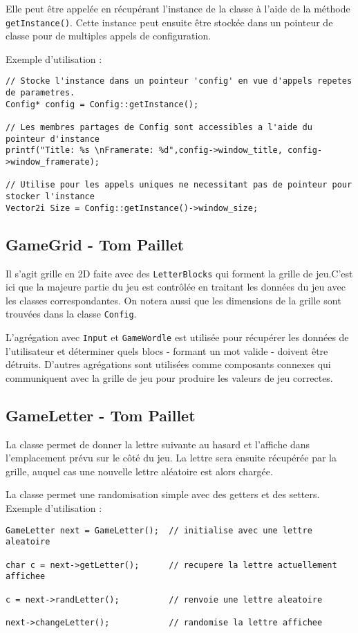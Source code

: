 \documentclass[11pt, openright]{book}
\begin{document}
    Elle peut être appelée en récupérant l'instance de la classe à l'aide de la méthode \texttt{getInstance()}.  Cette instance peut ensuite être stockée dans un pointeur de classe pour de multiples appels de configuration.

    Exemple d'utilisation : 
    \lstset{
  basicstyle=\scriptsize, %
}
     \begin{lstlisting}
// Stocke l'instance dans un pointeur 'config' en vue d'appels repetes de parametres.
Config* config = Config::getInstance();

// Les membres partages de Config sont accessibles a l'aide du pointeur d'instance 
printf("Title: %s \nFramerate: %d",config->window_title, config->window_framerate);

// Utilise pour les appels uniques ne necessitant pas de pointeur pour stocker l'instance
Vector2i Size = Config::getInstance()->window_size;
    \end{lstlisting}

     \subsection{GameGrid - Tom Paillet}

    Il s'agit grille en 2D faite avec des \texttt{LetterBlocks} qui forment la grille de jeu.C'est ici que la majeure partie du jeu est contrôlée en traitant les données 
    du jeu avec les classes correspondantes. On notera aussi que les dimensions de la grille sont trouvées dans la classe \texttt{Config}.

    L'agrégation avec \texttt{Input} et \texttt{GameWordle} est utilisée pour récupérer les données de l'utilisateur et déterminer quels blocs - formant un mot valide - doivent être détruits. D'autres agrégations sont utilisées comme composants connexes qui communiquent avec la grille de jeu pour produire les valeurs de jeu correctes.

     \subsection{GameLetter - Tom Paillet}

     La classe permet de donner la lettre suivante au hasard et l'affiche dans l'emplacement prévu sur le côté du jeu. La lettre sera ensuite récupérée par la grille, auquel cas une nouvelle lettre aléatoire est alors chargée.  

     La classe permet une randomisation simple avec des getters et des setters.\\
    Exemple d'utilisation :
     \begin{lstlisting}
GameLetter next = GameLetter();  // initialise avec une lettre aleatoire

char c = next->getLetter();      // recupere la lettre actuellement affichee

c = next->randLetter();          // renvoie une lettre aleatoire

next->changeLetter();            // randomise la lettre affichee
    \end{lstlisting}
\end{document}
